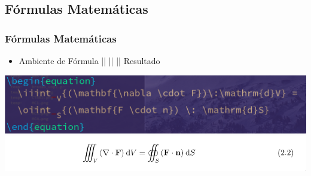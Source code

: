 \documentclass{beamer}
\begin{document}
\begin{frame}
  \section{Fórmulas Matemáticas}
  \frametitle{Fórmulas Matemáticas}

  \begin{itemize}
  \item Ambiente de Fórmula || || || Resultado
  \end{itemize}
  \begin{center}
    \includegraphics[scale=0.30]{../Imagens/A2I71.png}
    \includegraphics[scale=0.40]{../Imagens/A2I72.png}
  \end{center}
\end{frame}
\end{document}
